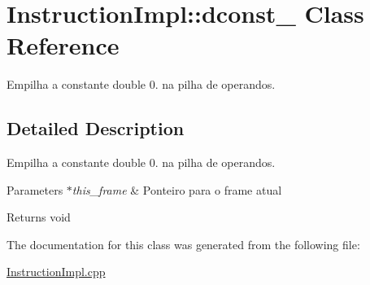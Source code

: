\hypertarget{class_instruction_impl_1_1dconst__0}{}\section{Instruction\+Impl\+:\+:dconst\+\_ Class Reference}
\label{class_instruction_impl_1_1dconst__0}


Empilha a constante double 0. na pilha de operandos.  




\subsection{Detailed Description}
Empilha a constante double 0. na pilha de operandos. 


\begin{DoxyParams}{Parameters}
{\em $\ast$this\+\_\+frame} & Ponteiro para o frame atual \\
\hline
\end{DoxyParams}
\begin{DoxyReturn}{Returns}
void 
\end{DoxyReturn}


The documentation for this class was generated from the following file\+:\begin{DoxyCompactItemize}
\item 
\hyperlink{_instruction_impl_8cpp}{Instruction\+Impl.\+cpp}\end{DoxyCompactItemize}
